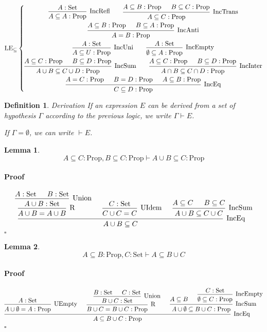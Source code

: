 \documentclass[]{article}
\newcommand{\1}{\mathbbm{1}}
\newcommand{\0}{\mathbbm{0}}
\newtheorem{lem}{Lemma}
\newtheorem{defi}{Definition}
\newenvironment{prf}{\paragraph{Proof}}{\hfill$\square$}
\newcommand{\Prop}{\text{Prop}}
\newcommand{\Set}{\text{Set}}
\newcommand{\proof}[1]{{\scantokens{\begin{prooftree}#1\end{prooftree}}}}
\renewcommand{\subset}{\subseteq}
\begin{document}
\[\text{LE}_\subset\left\{
    \begin{gathered}
        \proof{
            \hypo{A:\Set}
            \infer1[IncRefl]{A\subset A : \Prop}
        }
        \qquad\proof{
            \hypo{A\subset B : \Prop}
            \hypo{B\subset C : \Prop}
            \infer2[IncTrans]{A\subset C:\Prop}
        }\\
        \proof{
            \hypo{A\subset B : \Prop}
            \hypo{B\subset A : \Prop}
            \infer2[IncAnti]{A = B : \Prop}
        }\\
        \proof{
            \hypo{A : \Set}
            \infer1[IncUni]{A\subset U : \Prop}
        }
        \qquad\proof{
            \hypo{A : \Set}
            \infer1[IncEmpty]{\emptyset\subset A : \Prop}
        }\\
        \proof{
            \hypo{A \subset C : \Prop}
            \hypo{B \subset D : \Prop}
            \infer2[IncSum]{A\cup B \subset C\cup D : \Prop}
        }
        \qquad\proof{
            \hypo{A \subset C : \Prop}
            \hypo{B \subset D : \Prop}
            \infer2[IncInter]{A\cap B \subset C\cap D : \Prop}
        }\\
        \proof{
            \hypo{A= C : \Prop}
            \hypo{B= D : \Prop}
            \hypo{A \subset B : \Prop}
            \infer3[IncEq]{C\subset D : \Prop}
        }
    \end{gathered}
\right.\]

\begin{defi}{Derivation}
    If an expression $E$ can be derived from a set of hypothesis $\Gamma$
    according to the previous logic, we write $\Gamma\vdash E$.

    If $\Gamma = \emptyset$, we can write $\vdash E$.
\end{defi}

\begin{lem}\label{inc_sum_right}
    \[A\subset C:\Prop, B\subset C:\Prop\vdash A\cup B\subset C:\Prop \]
\end{lem}
\begin{prf}
    \[\proof{
        \hypo{A : \Set}
        \hypo{B : \Set}
        \infer2[Union]{A\cup B : \Set}
        \infer1[R]{A\cup B = A\cup B}
        \hypo{C : \Set}
        \infer1[UIdem]{C\cup C = C}
        \hypo{A\subset C}
        \hypo{B\subset C}
        \infer2[IncSum]{A\cup B\subset C\cup C}
        \infer3[IncEq]{A\cup B\subset C}
    }\]
\end{prf}

\begin{lem}\label{inc_sum_left}
    \[A\subset B:\Prop, C:\Set\vdash A\subset B\cup C\]
\end{lem}
\begin{prf}
    \[\proof{
        \hypo{A:\Set}
        \infer1[UEmpty]{A\cup\emptyset = A:\Prop}
        \hypo{B:\Set}
        \hypo{C:\Set}
        \infer2[Union]{B\cup C:\Set}
        \infer1[R]{B\cup C=B\cup C:\Prop}
        \hypo{A\subset B}
        \hypo{C : \Set}
        \infer1[IncEmpty]{\emptyset\subset C:\Prop}
        \infer2[IncSum]{A\cup\emptyset \subset B\cup C:\Prop}
        \infer3[IncEq]{A\subset B\cup C:\Prop}
    }\]
\end{prf}
\end{document}
